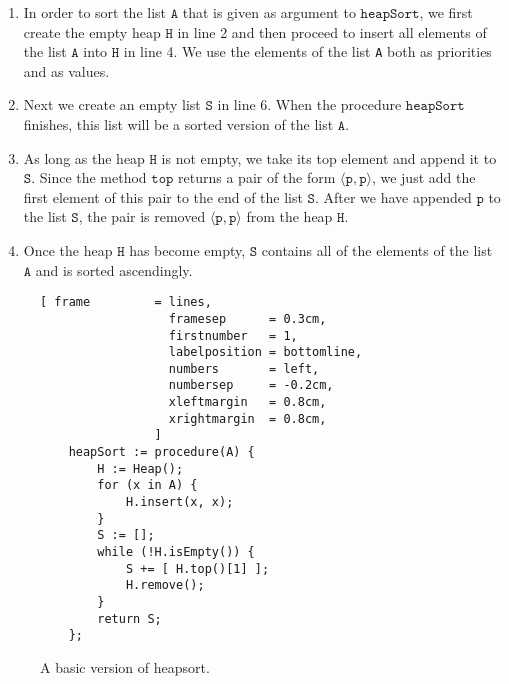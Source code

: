 \begin{enumerate}
\item In order to sort the list $\texttt{A}$ that is given as argument to $\texttt{heapSort}$, we first
      create the empty heap $\texttt{H}$ in line 2 and then proceed to insert all elements of the list
      $\texttt{A}$ into $\texttt{H}$ in line 4.  We use the elements of the list \texttt{A} both as priorities
      and as values. 
\item Next we create an empty list $\texttt{S}$ in line 6. When the procedure $\texttt{heapSort}$
      finishes, this list will be a sorted version of the list $\texttt{A}$.
\item As long as the heap $\texttt{H}$ is not empty, we take its top element and append it to
      $\texttt{S}$.  Since the method $\texttt{top}$ returns a pair of the form $\langle \texttt{p}, \texttt{p}\rangle$,
      we just add the first element of this pair to the
      end of the list $\texttt{S}$.  After we have appended $\texttt{p}$ to the list $\texttt{S}$, the pair
      is removed $\langle \texttt{p}, \texttt{p}\rangle$ from the heap $\texttt{H}$.
\item Once the heap $\texttt{H}$ has become empty, $\texttt{S}$ contains all of the elements of the list $\texttt{A}$
      and is sorted ascendingly.
\end{enumerate}

\begin{figure}[!ht]
\centering
\begin{Verbatim}[ frame         = lines, 
                  framesep      = 0.3cm, 
                  firstnumber   = 1,
                  labelposition = bottomline,
                  numbers       = left,
                  numbersep     = -0.2cm,
                  xleftmargin   = 0.8cm,
                  xrightmargin  = 0.8cm,
                ]
    heapSort := procedure(A) {
        H := Heap();    
        for (x in A) {
            H.insert(x, x);
        }
        S := [];
        while (!H.isEmpty()) {
            S += [ H.top()[1] ];
            H.remove();
        }
        return S;
    };
\end{Verbatim}
\vspace*{-0.3cm}
\caption{A basic version of heapsort.}
\label{fig:basic-heapsort.stlx}
\end{figure}

